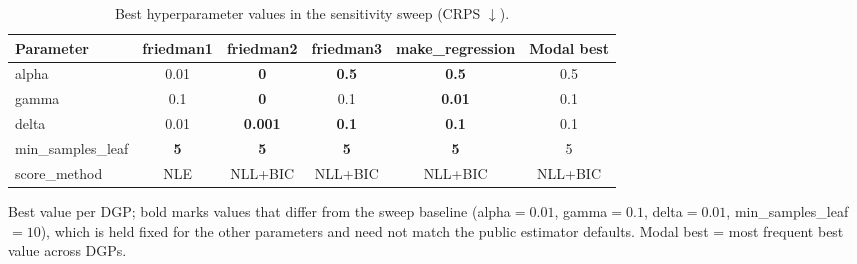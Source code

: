 \begin{table}[htbp]
\centering
\caption{Best hyperparameter values in the sensitivity sweep (CRPS $\downarrow$).}
\label{tab:param-sensitivity}
\begin{tabular}{lccccc}
\toprule
Parameter & friedman1 & friedman2 & friedman3 & make\_regression & Modal best \\
\midrule
alpha & 0.01 & \textbf{0} & \textbf{0.5} & \textbf{0.5} & 0.5 \\
gamma & 0.1 & \textbf{0} & 0.1 & \textbf{0.01} & 0.1 \\
delta & 0.01 & \textbf{0.001} & \textbf{0.1} & \textbf{0.1} & 0.1 \\
min\_samples\_leaf & \textbf{5} & \textbf{5} & \textbf{5} & \textbf{5} & 5 \\
\midrule
score\_method & NLE & NLL+BIC & NLL+BIC & NLL+BIC & NLL+BIC \\
\bottomrule
\end{tabular}
\par\smallskip\footnotesize{Best value per DGP; bold marks values that differ from the sweep baseline (alpha$=0.01$, gamma$=0.1$, delta$=0.01$, min\_samples\_leaf$=10$), which is held fixed for the other parameters and need not match the public estimator defaults. Modal best = most frequent best value across DGPs.}
\end{table}
